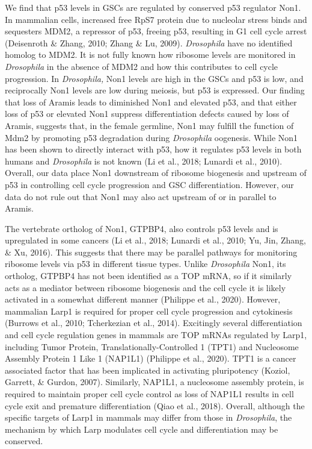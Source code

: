 \documentclass[12pt,oneside]{reedthesis}
\begin{document}
We find that p53 levels in GSCs are regulated by conserved p53 regulator
Non1. In mammalian cells, increased free RpS7 protein due to nucleolar
stress binds and sequesters MDM2, a repressor of p53, freeing p53,
resulting in G1 cell cycle arrest (Deisenroth \& Zhang, 2010; Zhang \& Lu, 2009). \emph{Drosophila} have no identified
homolog to MDM2. It is not fully known how ribosome levels are monitored
in \emph{Drosophila} in the absence of MDM2 and how this contributes to cell
cycle progression. In \emph{Drosophila,} Non1 levels are high in the GSCs and
p53 is low, and reciprocally Non1 levels are low during meiosis, but p53
is expressed. Our finding that loss of Aramis leads to diminished Non1
and elevated p53, and that either loss of p53 or elevated Non1 suppress
differentiation defects caused by loss of Aramis, suggests that, in the
female germline, Non1 may fulfill the function of Mdm2 by promoting p53
degradation during \emph{Drosophila} oogenesis. While Non1 has been shown to
directly interact with p53, how it regulates p53 levels in both humans
and \emph{Drosophila} is not known (Li et al., 2018; Lunardi et al., 2010). Overall,
our data place Non1 downstream of ribosome biogenesis and upstream of
p53 in controlling cell cycle progression and GSC differentiation.
However, our data do not rule out that Non1 may also act upstream of or
in parallel to Aramis.

The vertebrate ortholog of Non1, GTPBP4, also controls p53 levels and is
upregulated in some cancers (Li et al., 2018; Lunardi et al., 2010; Yu, Jin, Zhang, \& Xu, 2016). This suggests that there may be
parallel pathways for monitoring ribosome levels via p53 in different
tissue types. Unlike \emph{Drosophila} Non1, its ortholog, GTPBP4 has not
been identified as a TOP mRNA, so if it similarly acts as a mediator
between ribosome biogenesis and the cell cycle it is likely activated in
a somewhat different manner (Philippe et al., 2020).
However, mammalian Larp1 is required for proper cell cycle progression
and cytokinesis (Burrows et al., 2010; Tcherkezian et al., 2014).
Excitingly several differentiation and cell cycle regulation genes in
mammals are TOP mRNAs regulated by Larp1, including Tumor Protein,
Translationally-Controlled 1 (TPT1) and Nucleosome Assembly Protein 1
Like 1 (NAP1L1) (Philippe et al., 2020). TPT1 is a cancer
associated factor that has been implicated in activating pluripotency
(Koziol, Garrett, \& Gurdon, 2007). Similarly, NAP1L1, a
nucleosome assembly protein, is required to maintain proper cell cycle
control as loss of NAP1L1 results in cell cycle exit and premature
differentiation (Qiao et al., 2018). Overall, although
the specific targets of Larp1 in mammals may differ from those in
\emph{Drosophila}, the mechanism by which Larp modulates cell cycle and
differentiation may be conserved.
\end{document}
